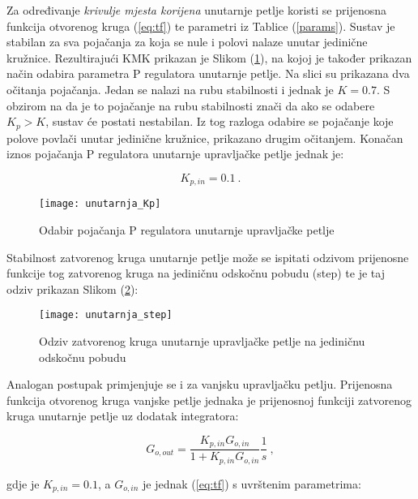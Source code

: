 \documentclass[11pt,a4paper]{article}
\begin{document}
\medskip

Za određivanje \textit{krivulje mjesta korijena} unutarnje petlje koristi se prijenosna funkcija otvorenog kruga (\ref{eq:tf}) te parametri iz Tablice (\ref{params}). Sustav je stabilan za sva pojačanja za koja se nule i polovi nalaze unutar jedinične kružnice.  Rezultirajući KMK prikazan je Slikom (\ref{fig:unutarnja_Kp}), na kojoj je također prikazan način odabira parametra P regulatora unutarnje petlje. Na slici su prikazana dva očitanja pojačanja. Jedan se nalazi na rubu stabilnosti i jednak je $K= 0.7$. S obzirom na da je to pojačanje na rubu stabilnosti znači da ako se odabere $K_{p} > K$, sustav će postati nestabilan. Iz tog razloga odabire se pojačanje koje polove povlači unutar jedinične kružnice, prikazano drugim očitanjem. Konačan iznos pojačanja P regulatora unutarnje upravljačke petlje jednak je:

 \begin{equation}
 \boxed{
 K_{p,in} = 0.1
 } \ .
 \label{eq:Kp_in}
 \end{equation}


\begin{figure}[H]
	\centering
	\texttt{[image: unutarnja\_Kp]}
	\caption{Odabir pojačanja P regulatora unutarnje upravljačke petlje}
	\label{fig:unutarnja_Kp}
\end{figure}

Stabilnost zatvorenog kruga unutarnje petlje može se ispitati odzivom prijenosne funkcije tog zatvorenog kruga na jediničnu odskočnu pobudu (step) te je taj odziv prikazan Slikom (\ref{fig:step1}):

\begin{figure}[H]
	\centering
	\texttt{[image: unutarnja\_step]}
	\caption{Odziv zatvorenog kruga unutarnje upravljačke petlje na jediničnu odskočnu pobudu}
	\label{fig:step1}
\end{figure}


Analogan postupak primjenjuje se i za vanjsku upravljačku petlju. Prijenosna funkcija otvorenog kruga vanjske petlje jednaka je prijenosnoj funkciji zatvorenog kruga unutarnje petlje uz dodatak integratora:

\begin{equation}
G_{o,out} = \frac{K_{p,in}G_{o,in}}{1 + K_{p,in}G_{o,in}} \frac{1}{s}\ ,
\label{eq:tf2}
\end{equation}

gdje je $K_{p,in} = 0.1$, a $G_{o,in}$  je jednak (\ref{eq:tf}) s uvrštenim parametrima:
\end{document}
